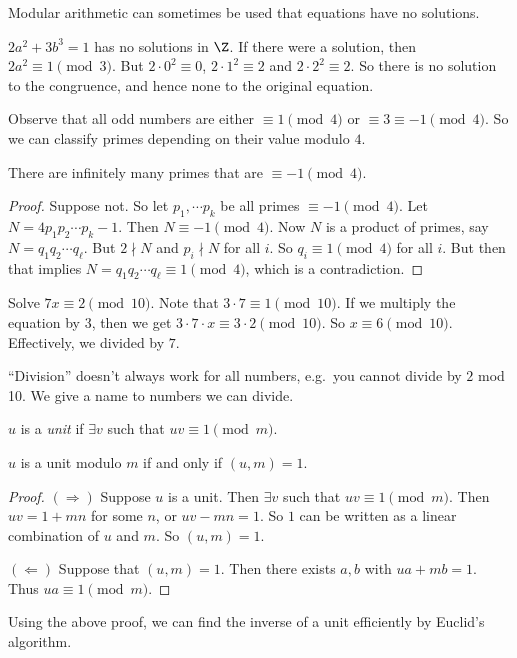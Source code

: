 \documentclass[a4paper]{article}
\begin{document}
Modular arithmetic can sometimes be used that equations have no solutions.
\begin{eg}
  $2a^2 + 3b^3 = 1$ has no solutions in $\Z$. If there were a solution, then $2a^2 \equiv 1\pmod 3$. But $2\cdot 0^2 \equiv 0$, $2\cdot 1^2\equiv 2$ and $2\cdot 2^2 \equiv 2$. So there is no solution to the congruence, and hence none to the original equation.
\end{eg}

Observe that all odd numbers are either $\equiv 1\pmod 4$ or $\equiv 3\equiv -1\pmod 4$. So we can classify primes depending on their value modulo $4$.

\begin{thm}
  There are infinitely many primes that are $\equiv -1 \pmod 4$.
\end{thm}

\begin{proof}
  Suppose not. So let $p_1, \cdots p_k$ be all primes $\equiv -1 \pmod 4$. Let $N = 4p_1p_2\cdots p_k - 1$. Then $N\equiv -1\pmod 4$. Now $N$ is a product of primes, say $N= q_1q_2\cdots q_\ell$. But $2\nmid N$ and $p_i\nmid N$ for all $i$. So $q_i \equiv 1\pmod 4$ for all $i$. But then that implies $N = q_1q_2\cdots q_\ell \equiv 1\pmod 4$, which is a contradiction.
\end{proof}

\begin{eg}
  Solve $7x \equiv 2 \pmod {10}$. Note that $3\cdot 7\equiv 1\pmod {10}$. If we multiply the equation by $3$, then we get $3\cdot 7\cdot x \equiv 3\cdot 2\pmod {10}$. So $x\equiv 6\pmod {10}$. Effectively, we divided by $7$.
\end{eg}
``Division'' doesn't always work for all numbers, e.g.\ you cannot divide by $2$ mod 10. We give a name to numbers we can divide.

\begin{defi}
  $u$ is a \emph{unit} if $\exists v$ such that $uv \equiv 1\pmod m$.
\end{defi}

\begin{thm}
  $u$ is a unit modulo $m$ if and only if $(u, m) = 1$.
\end{thm}

\begin{proof}
  $(\Rightarrow)$ Suppose $u$ is a unit. Then $\exists v$ such that $uv \equiv 1\pmod m$. Then $uv = 1 + mn$ for some $n$, or $uv - mn = 1$. So $1$ can be written as a linear combination of $u$ and $m$. So $(u, m) = 1$.

  $(\Leftarrow)$ Suppose that $(u, m) = 1$. Then there exists $a, b$ with $ua + mb = 1$. Thus $ua \equiv 1\pmod m$.
\end{proof}
Using the above proof, we can find the inverse of a unit efficiently by Euclid's algorithm.
\end{document}
